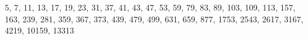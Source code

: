 5, 7, 11, 13, 17, 19, 23, 31, 37, 41, 43, 47, 53, 59, 79, 83, 89, 103, 109, 113, 157, 163, 239, 281, 359, 367, 373, 439, 479, 499, 631, 659, 877, 1753, 2543, 2617, 3167, 4219, 10159, 13313